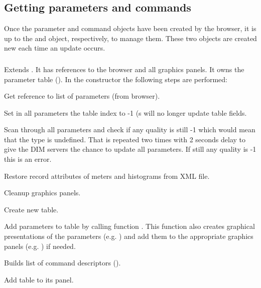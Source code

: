\subsection{Getting parameters and commands}
Once the parameter and command objects have been created by the browser, it is up to the 
 and  object, respectively, to manage them.
These two objects are created new each time an update occurs.
\subsubsection{}
Extends .
It has references to the browser and all graphics panels. It owns the parameter table
(). In the constructor the following steps are performed:
\bnum
\item Get reference to list of parameters (from browser).
\item Set in all parameters the table index to -1 (s will no longer update
table fields.
\item Scan through all parameters and check if any quality is still -1 which would mean
that the type is undefined. That is repeated two times with 2 seconds delay to give
the DIM servers the chance to update all parameters. If still any quality is -1 this is an error.
\item Restore record attributes of meters and histograms from XML file.
\item Cleanup graphics panels.
\item Create new table.
\item Add parameters to table by calling function . This function
also creates graphical presentations of the parameters (e.g. ) and add them to the appropriate graphics panels (e.g. ) if needed.
\item Builds list of command descriptors ().
\item Add table to its panel.
\enum
